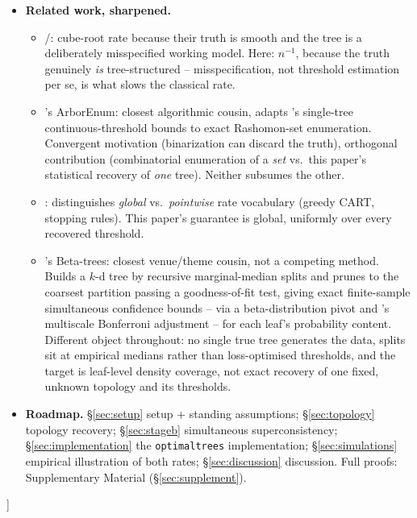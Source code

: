 \documentclass[11pt]{article}
\theoremstyle{plain}
\theoremstyle{definition}
\theoremstyle{remark}
\newcommand{\cX}{\mathcal{X}}
\begin{document}
\begin{itemize}
  Under Assumption~\ref{ass:continuum-sparsity} alone this uniqueness is
  assumed, not derived; Theorem~\ref{thm:true-partition} of
  \S\ref{sec:setup-uniqueness} derives it from (S), (Reduced), (Node), the
  mutual absolute continuity of $\nu$ and Lebesgue measure on $\cX$, and
  one added geometric condition on the support, for a minimal realisation
  satisfying the leaf-level hypotheses (Remark~\ref{rem:true-tree-open}).)
\item \textbf{Related work, sharpened.}
  \begin{itemize}
  \item \citet{seootsu2018}/\citet{song2016}: cube-root rate because their
    truth is smooth and the tree is a deliberately misspecified working
    model. Here: $n^{-1}$, because the truth genuinely \emph{is}
    tree-structured -- misspecification, not threshold estimation per se,
    is what slows the classical rate.
  \item \citet{heile2026arborenum}'s ArborEnum: closest algorithmic
    cousin, adapts \citet{brita2025contree}'s single-tree
    continuous-threshold bounds to exact Rashomon-set enumeration.
    Convergent motivation (binarization can discard the truth), orthogonal
    contribution (combinatorial enumeration of a \emph{set} vs.\ this
    paper's statistical recovery of \emph{one} tree). Neither subsumes the
    other.
  \item \citet{xu2026stopping}: distinguishes \emph{global} vs.\
    \emph{pointwise} rate vocabulary (greedy CART, stopping rules). This
    paper's guarantee is global, uniformly over every recovered threshold.
  \item \citet{waltherzhao2026}'s Beta-trees: closest venue/theme cousin,
    not a competing method. Builds a $k$-d tree by recursive marginal-median
    splits and prunes to the coarsest partition passing a goodness-of-fit
    test, giving exact finite-sample simultaneous confidence bounds --
    via a beta-distribution pivot and \citet{waltherperry2022}'s
    multiscale Bonferroni adjustment -- for each leaf's probability
    content. Different object throughout: no single true tree generates
    the data, splits sit at empirical medians rather than loss-optimised
    thresholds, and the target is leaf-level density coverage, not exact
    recovery of one fixed, unknown topology and its thresholds.
  \end{itemize}
\item \textbf{Roadmap.} \S\ref{sec:setup} setup + standing assumptions;
  \S\ref{sec:topology} topology recovery; \S\ref{sec:stageb} simultaneous
  superconsistency; \S\ref{sec:implementation} the \texttt{optimaltrees}
  implementation; \S\ref{sec:simulations} empirical illustration of both
  rates; \S\ref{sec:discussion} discussion. Full proofs: Supplementary
  Material (\S\ref{sec:supplement}).
\end{itemize}]
\end{document}
